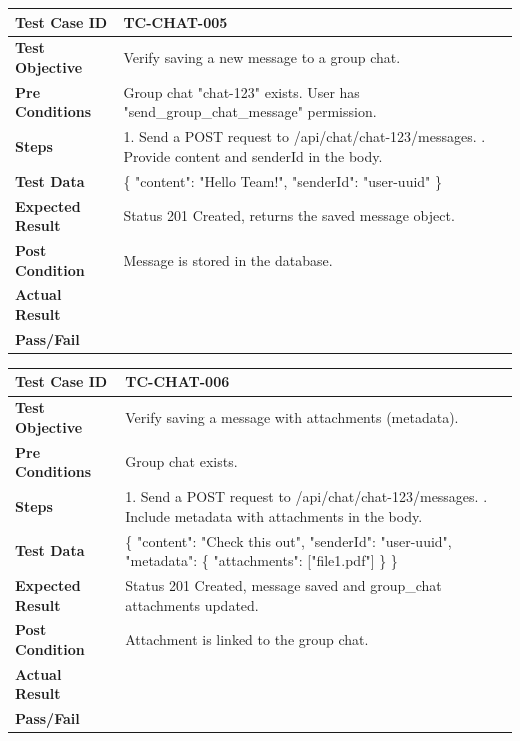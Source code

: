 \begin{longtable}{|p{}|p{}|}
\hline
\textbf{Test Case ID} & TC-CHAT-005 \\ \hline
\textbf{Test Objective} & Verify saving a new message to a group chat. \\ \hline
\textbf{Pre Conditions} & Group chat "chat-123" exists. User has "send_group_chat_message" permission. \\ \hline
\textbf{Steps} & 
1. Send a POST request to /api/chat/chat-123/messages. \newline
2. Provide content and senderId in the body. \\ \hline
\textbf{Test Data} & \{ "content": "Hello Team!", "senderId": "user-uuid" \} \\ \hline
\textbf{Expected Result} & Status 201 Created, returns the saved message object. \\ \hline
\textbf{Post Condition} & Message is stored in the database. \\ \hline
\textbf{Actual Result} &  \\ \hline
\textbf{Pass/Fail} &  \\ \hline
\end{longtable}

\begin{longtable}{|p{}|p{}|}
\hline
\textbf{Test Case ID} & TC-CHAT-006 \\ \hline
\textbf{Test Objective} & Verify saving a message with attachments (metadata). \\ \hline
\textbf{Pre Conditions} & Group chat exists. \\ \hline
\textbf{Steps} & 
1. Send a POST request to /api/chat/chat-123/messages. \newline
2. Include metadata with attachments in the body. \\ \hline
\textbf{Test Data} & \{ "content": "Check this out", "senderId": "user-uuid", "metadata": \{ "attachments": ["file1.pdf"] \} \} \\ \hline
\textbf{Expected Result} & Status 201 Created, message saved and group\_chat attachments updated. \\ \hline
\textbf{Post Condition} & Attachment is linked to the group chat. \\ \hline
\textbf{Actual Result} &  \\ \hline
\textbf{Pass/Fail} &  \\ \hline
\end{longtable}

